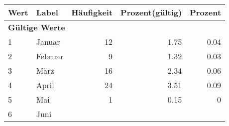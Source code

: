      \begin{longtable}{lXrrr}
     \toprule
     \textbf{Wert} & \textbf{Label} & \textbf{Häufigkeit} & \textbf{Prozent(gültig)} & \textbf{Prozent} \\
     \endhead
     \midrule
     \multicolumn{5}{l}{\textbf{Gültige Werte}}\\

     1 &
     \multicolumn{1}{X}{ Januar   } &


       \num{12} &
       \num[round-mode=places,round-precision=2]{1.75} &
         \num[round-mode=places,round-precision=2]{0.04} \\

     2 &
     \multicolumn{1}{X}{ Februar   } &


       \num{9} &
       \num[round-mode=places,round-precision=2]{1.32} &
         \num[round-mode=places,round-precision=2]{0.03} \\

     3 &
     \multicolumn{1}{X}{ März   } &


       \num{16} &
       \num[round-mode=places,round-precision=2]{2.34} &
         \num[round-mode=places,round-precision=2]{0.06} \\

     4 &
     \multicolumn{1}{X}{ April   } &


       \num{24} &
       \num[round-mode=places,round-precision=2]{3.51} &
         \num[round-mode=places,round-precision=2]{0.09} \\

     5 &
     \multicolumn{1}{X}{ Mai   } &


       \num{1} &
       \num[round-mode=places,round-precision=2]{0.15} &
         \num[round-mode=places,round-precision=2]{0} \\

     6 &
     \multicolumn{1}{X}{ Juni   } &



\end{longtable}
